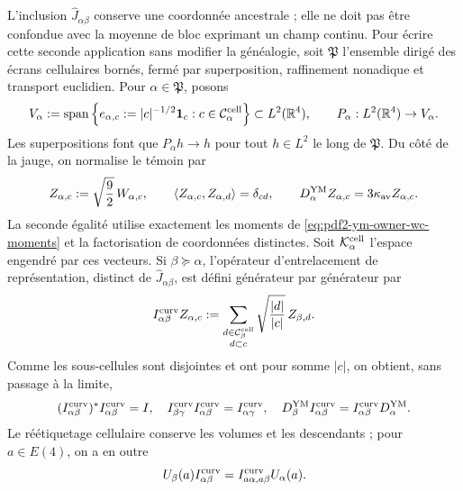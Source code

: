 L'inclusion $\widehat J_{\alpha\beta}$ conserve une coordonnée ancestrale ; elle ne doit pas être confondue avec la moyenne de bloc exprimant un champ continu. Pour écrire cette seconde application sans modifier la généalogie, soit $\mathfrak P$ l'ensemble dirigé des écrans cellulaires bornés, fermé par superposition, raffinement nonadique et transport euclidien. Pour $\alpha\in\mathfrak P$, posons
\begin{equation}\label{eq:pdf2-ym-owner-cell-step-space}
 V_\alpha:=\operatorname{span}\left\{
 e_{\alpha,c}:=|c|^{-1/2}\mathbf1_c:
 c\in\mathcal C_\alpha^{\rm cell}\right\}
 \subset L^2(\mathbb R^4),
 \qquad P_\alpha:L^2(\mathbb R^4)\to V_\alpha.
\end{equation}
Les superpositions font que $P_\alpha h\to h$ pour tout $h\in L^2$ le long de
$\mathfrak P$. Du côté de la jauge, on normalise le témoin par
\begin{equation}\label{eq:pdf2-ym-owner-normalized-cell-witness}
 Z_{\alpha,c}:=\sqrt{\frac92}\,W_{\alpha,c},
 \qquad
 \langle Z_{\alpha,c},Z_{\alpha,d}\rangle=\delta_{cd},
 \qquad
 D_\alpha^{\rm YM}Z_{\alpha,c}=3\kappa_{\rm av}Z_{\alpha,c}.
\end{equation}
La seconde égalité utilise exactement les moments de \eqref{eq:pdf2-ym-owner-wc-moments} et la factorisation de coordonnées distinctes. Soit $\mathcal K_\alpha^{\rm cell}$ l'espace engendré par ces vecteurs. Si $\beta\succeq\alpha$, l'opérateur d'entrelacement de représentation, distinct de $\widehat J_{\alpha\beta}$, est défini générateur par générateur par
\begin{equation}\label{eq:pdf2-ym-owner-block-intertwiner}
 I_{\alpha\beta}^{\rm curv}Z_{\alpha,c}
 :=\sum_{\substack{d\in\mathcal C_\beta^{\rm cell}\\d\subset c}}
       \sqrt{\frac{|d|}{|c|}}\,Z_{\beta,d}.
\end{equation}
Comme les sous-cellules sont disjointes et ont pour somme $|c|$, on obtient, sans passage à la limite,
\begin{equation}\label{eq:pdf2-ym-owner-block-intertwiner-identities}
 (I_{\alpha\beta}^{\rm curv})^*I_{\alpha\beta}^{\rm curv}=I,
 \quad
 I_{\beta\gamma}^{\rm curv}I_{\alpha\beta}^{\rm curv}
 =I_{\alpha\gamma}^{\rm curv},
 \quad
 D_\beta^{\rm YM}I_{\alpha\beta}^{\rm curv}
 =I_{\alpha\beta}^{\rm curv}D_\alpha^{\rm YM}.
\end{equation}
Le réétiquetage cellulaire conserve les volumes et les descendants ; pour $a\in E(4)$, on a en outre
\begin{equation}\label{eq:pdf2-ym-owner-block-e4-naturality}
 U_\beta(a)I_{\alpha\beta}^{\rm curv}
 =I_{a\alpha,a\beta}^{\rm curv}U_\alpha(a).
\end{equation}

